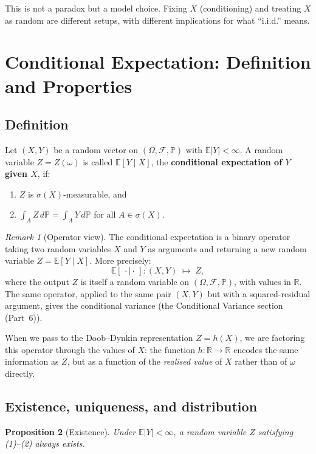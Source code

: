 \documentclass[a4paper,oneside,12pt]{extarticle}
\theoremstyle{plain}
\newtheorem{proposition}{Proposition}
\theoremstyle{definition}
\theoremstyle{remark}
\newtheorem{remark}[proposition]{Remark}
\newcommand*{\E}{\mathbb{E}}
\newcommand*{\mP}{\mathbb{P}}
\newcommand*{\mR}{\mathbb{R}}
\newcommand*{\mbF}{\mathcal{F}}
\begin{document}
This is not a paradox but a model choice. Fixing $X$ (conditioning)
and treating $X$ as random are different setups, with different
implications for what ``i.i.d.'' means.

\section{Conditional Expectation: Definition and Properties}
\label{sec:condexp}

\subsection{Definition}

Let $(X,Y)$ be a random vector on $(\Omega, \mbF, \mP)$ with $\E|Y| < \infty$.
A random variable $Z = Z(\omega)$ is called $\E[Y \mid X]$, the
\textbf{conditional expectation of $Y$ given $X$}, if:
\begin{enumerate}[label=(\arabic*)]
  \item $Z$ is $\sigma(X)$-measurable, and
  \item $\int_A Z\,d\mP = \int_A Y\,d\mP$ for all $A \in \sigma(X)$.
\end{enumerate}

\begin{remark}[Operator view]
The conditional expectation is a binary operator taking two random
variables $X$ and $Y$ as arguments and returning a new random variable
$Z = \E[Y \mid X]$. More precisely:
\[
  \E[\,\cdot \mid \cdot\,]: (X, Y) \;\longmapsto\; Z,
\]
where the output $Z$ is itself a random variable on $(\Omega, \mbF, \mP)$,
with values in $\mR$. The same operator, applied to the same pair
$(X,Y)$ but with a squared-residual argument, gives the conditional
variance (the Conditional Variance section (Part~6)).

When we pass to the Doob--Dynkin representation $Z = h(X)$, we are
factoring this operator through the values of $X$: the function
$h:\mR\to\mR$ encodes the same information as $Z$, but as a function
of the \emph{realised value} of $X$ rather than of $\omega$ directly.
\end{remark}

\subsection{Existence, uniqueness, and distribution}

\begin{proposition}[Existence]
Under $\E|Y| < \infty$, a random variable $Z$ satisfying (1)--(2) always
exists.
\end{proposition}
\end{document}
